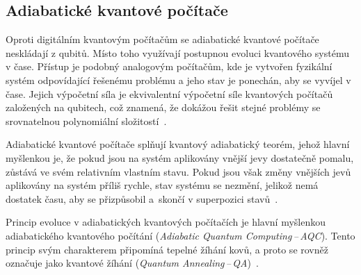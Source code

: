 \subsection{Adiabatické kvantové počítače}
Oproti digitálním kvantovým počítačům se adiabatické kvantové počítače neskládají z qubitů. 
Místo toho využívají postupnou evoluci kvantového systému v čase. 
Přístup je podobný analogovým počítačům, kde je vytvořen fyzikální systém odpovídající řešenému problému a jeho stav je ponechán, aby se vyvíjel v čase. 
Jejich výpočetní síla je ekvivalentní výpočetní síle kvantových počítačů založených na qubitech, což znamená, že dokážou řešit stejné problémy se srovnatelnou polynomiální složitostí~\cite{NaturalComputing}.

Adiabatické kvantové počítače splňují kvantový adiabatický teorém, jehož hlavní myšlenkou je, že pokud jsou na systém aplikovány vnější jevy dostatečně pomalu, zůstává ve svém relativním vlastním stavu. 
Pokud jsou však změny vnějších jevů aplikovány na systém příliš rychle, stav systému se nezmění, jelikož nemá dostatek času, aby se přizpůsobil a~skončí v superpozici stavů~\cite{NaturalComputing}. 

Princip evoluce v adiabatických kvantových počítačích je hlavní myšlenkou adiabatického kvantového počítání (\emph{Adiabatic Quantum Computing\,--\,AQC}). 
Tento princip svým charakterem připomíná tepelné žíhání kovů, a proto se rovněž označuje jako kvantové žíhání (\emph{Quantum Annealing\,--\,QA})~\cite{NaturalComputing}. 
